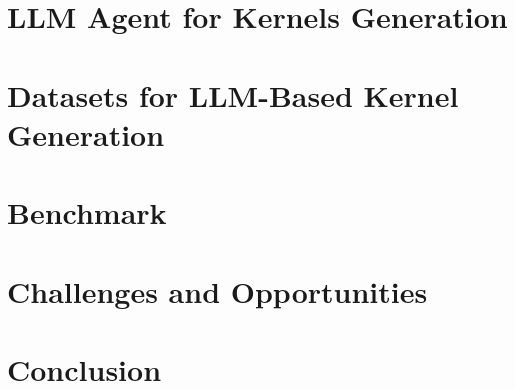 \documentclass{article}
\begin{document}
\section{LLM Agent for Kernels Generation}
\label{sec:agents}


\section{Datasets for LLM-Based Kernel Generation}
\label{sec:datasets}


\section{Benchmark}
\label{sec:benchmarks}


\section{Challenges and Opportunities}
\label{sec:future_work}


\section{Conclusion}
\label{sec:conclusion}





\end{document}
